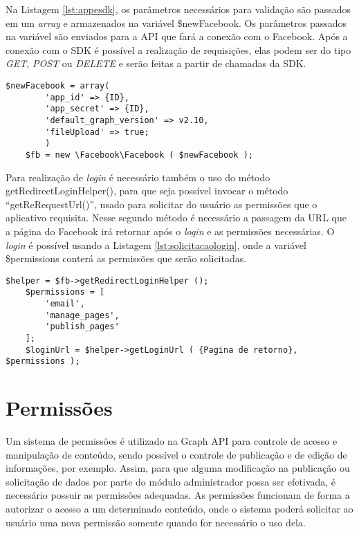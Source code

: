 Na Listagem \ref{lst:appesdk}, os parâmetros necessários para validação são passados em um \textit{array} e armazenados na variável \$newFacebook. Os parâmetros passados na variável são enviados para a API que fará a conexão com o Facebook. Após a conexão com o SDK é possível a realização de requisições, elas podem ser do tipo \textit{GET}, \textit{POST} ou \textit{DELETE} e serão feitas a partir de chamadas da SDK.

\begin{lstlisting}[caption={Conexão entre aplicativo e SDK},label={lst:appesdk}]
	$newFacebook = array(
		'app_id' => {ID},
		'app_secret' => {ID},
		'default_graph_version' => v2.10,
		'fileUpload' => true;
		)
	$fb = new \Facebook\Facebook ( $newFacebook );
\end{lstlisting}

Para realização de \textit{login} é necessário também o uso do método getRedirectLoginHelper(), para que seja possível invocar o método ``getReRequestUrl()'', usado para solicitar do usuário as permissões que o aplicativo requisita. Nesse segundo método é necessário a passagem da URL que a página do Facebook irá retornar após o \textit{login} e as permissões necessárias. O \textit{login} é possível usando a Listagem \ref{lst:solicitacaologin}, onde a variável \$permissions conterá as permissões que serão solicitadas.

\begin{lstlisting}[caption={Solicitação de Login},label={lst:solicitacaologin}]
	$helper = $fb->getRedirectLoginHelper ();
	$permissions = [
		'email',
		'manage_pages',
		'publish_pages'
	];
	$loginUrl = $helper->getLoginUrl ( {Pagina de retorno}, $permissions );
\end{lstlisting}

\section{Permissões}
\label{sec:permissoes}
Um sistema de permissões é utilizado na Graph API para controle de acesso e manipulação de conteúdo, sendo possível o controle de publicação e de edição de informações, por exemplo. Assim, para que alguma modificação na publicação ou solicitação de dados por parte do módulo administrador possa ser efetivada, é necessário possuir as permissões adequadas. As permissões funcionam de forma a autorizar o acesso a um determinado conteúdo, onde o sistema poderá solicitar ao usuário uma nova permissão somente quando for necessário o uso dela.

